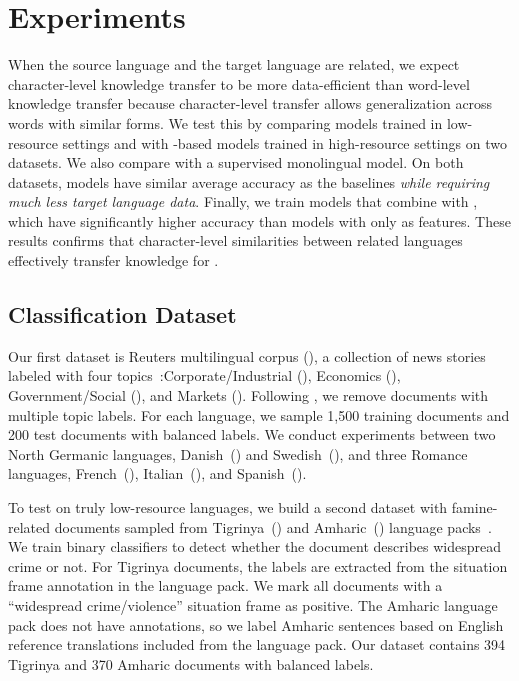\section{Experiments}\label{sec:experiments}

When the source language and the target language are related, we expect
character-level knowledge transfer to be more data-efficient than word-level
knowledge transfer because character-level transfer allows generalization
across words with similar forms. 
We test this by comparing \name{} models trained in low-resource settings and
with -based models trained in high-resource settings on two
 datasets.
We also compare \name{} with a supervised monolingual model.
On both datasets, \name{} models have similar average accuracy as the
baselines \emph{while requiring much less target language data}.
Finally, we train models that combine \name{} with , which have
significantly higher accuracy than models with only  as features.
These results confirms that character-level similarities between related
languages effectively transfer knowledge for .

\subsection{Classification Dataset} 

Our first dataset is Reuters multilingual corpus (), a collection of
news stories labeled with four topics~\citep{lewis-04}:Corporate/Industrial
(), Economics (), Government/Social (), and
Markets ().
Following \citet{klementiev-12}, we remove documents with multiple topic
labels.  For each language, we sample 1,500 training documents and 200 test
documents with balanced labels.  We conduct  experiments between two
North Germanic languages, Danish~() and Swedish~(), and three
Romance languages, French~(), Italian~(), and
Spanish~().

To test \name{} on truly low-resource languages, we build a second 
dataset with famine-related documents sampled from Tigrinya~() and
Amharic~()  language packs~\citep{strassel-16}.
We train binary classifiers to detect whether the document describes widespread
crime or not.  For Tigrinya documents, the labels are extracted from the
situation frame annotation in the language pack.  We mark all documents with a
``widespread crime/violence'' situation frame as positive.  The Amharic
language pack does not have annotations, so we label Amharic sentences
based on English reference translations included from the language pack.
Our dataset contains 394 Tigrinya and 370 Amharic documents with balanced
labels.

